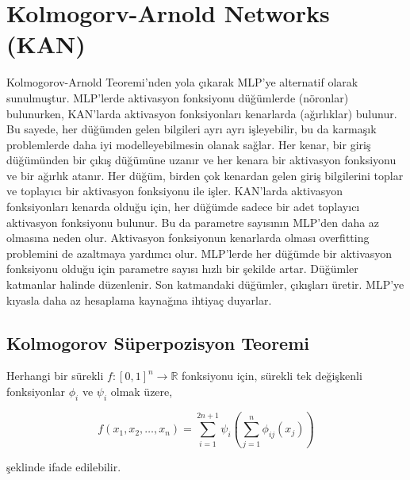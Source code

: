 \section{Kolmogorv-Arnold Networks (KAN)}

Kolmogorov-Arnold Teoremi'nden yola çıkarak MLP'ye alternatif olarak sunulmuştur. MLP'lerde aktivasyon fonksiyonu düğümlerde (nöronlar) bulunurken, KAN'larda aktivasyon fonksiyonları kenarlarda (ağırlıklar) bulunur. Bu sayede, her düğümden gelen bilgileri ayrı ayrı işleyebilir, bu da karmaşık problemlerde daha iyi modelleyebilmesin olanak sağlar. Her kenar, bir giriş düğümünden bir çıkış düğümüne uzanır ve her kenara bir aktivasyon fonksiyonu ve bir ağırlık atanır. Her düğüm, birden çok kenardan gelen giriş bilgilerini toplar ve toplayıcı bir aktivasyon fonksiyonu ile işler. KAN'larda aktivasyon fonksiyonları kenarda olduğu için, her düğümde sadece bir adet toplayıcı aktivasyon fonksiyonu bulunur. Bu da parametre sayısının MLP'den daha az olmasına neden olur. Aktivasyon fonksiyonun kenarlarda olması overfitting problemini de azaltmaya yardımcı olur. MLP'lerde her düğümde bir aktivasyon fonksiyonu olduğu için parametre sayısı hızlı bir şekilde artar. Düğümler katmanlar halinde düzenlenir. Son katmandaki düğümler, çıkışları üretir. MLP'ye kıyasla daha az hesaplama kaynağına ihtiyaç duyarlar. 

\subsection{Kolmogorov Süperpozisyon Teoremi}
Herhangi bir sürekli \( f: [0,1]^n \rightarrow \mathbb{R} \) fonksiyonu için, sürekli tek değişkenli fonksiyonlar \( \phi_i \) ve \( \psi_i \) olmak üzere,

\[
f(x_1, x_2, \ldots, x_n) = \sum_{i=1}^{2n+1} \psi_i \left( \sum_{j=1}^{n} \phi_{ij}(x_j) \right)
\]

şeklinde ifade edilebilir.

\newpage